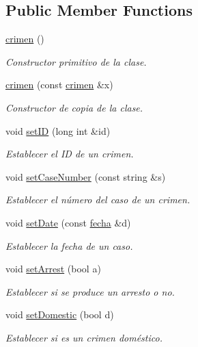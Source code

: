 \subsection*{Public Member Functions}
\begin{DoxyCompactItemize}
\item 
\hyperlink{classcrimen_ab1147e36869c7e635699e4ef746a7555}{crimen} ()
\begin{DoxyCompactList}\small\item\em Constructor primitivo de la clase. \end{DoxyCompactList}\item 
\hyperlink{classcrimen_a50b783e821c2f5bc829eceb9048c12d7}{crimen} (const \hyperlink{classcrimen}{crimen} \&x)
\begin{DoxyCompactList}\small\item\em Constructor de copia de la clase. \end{DoxyCompactList}\item 
void \hyperlink{classcrimen_a2675734f5049f41b5fb5dbc4778df7f8}{set\+I\+D} (long int \&id)
\begin{DoxyCompactList}\small\item\em Establecer el I\+D de un crimen. \end{DoxyCompactList}\item 
void \hyperlink{classcrimen_a98ee8c42a0ec09c704c5f17e812a6bd5}{set\+Case\+Number} (const string \&s)
\begin{DoxyCompactList}\small\item\em Establecer el número del caso de un crimen. \end{DoxyCompactList}\item 
void \hyperlink{classcrimen_ac308c139bb8b599a7badbecd91bfbc5a}{set\+Date} (const \hyperlink{classfecha}{fecha} \&d)
\begin{DoxyCompactList}\small\item\em Establecer la fecha de un caso. \end{DoxyCompactList}\item 
void \hyperlink{classcrimen_ae08b85470038469179a01ba753b7641a}{set\+Arrest} (bool a)
\begin{DoxyCompactList}\small\item\em Establecer si se produce un arresto o no. \end{DoxyCompactList}\item 
void \hyperlink{classcrimen_a3ec14cf4bb0464350d8efd98d2679d41}{set\+Domestic} (bool d)
\begin{DoxyCompactList}\small\item\em Establecer si es un crimen doméstico. \end{DoxyCompactList}\item 

\end{DoxyCompactItemize}
